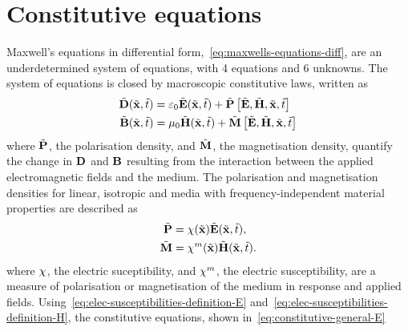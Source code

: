\section{Constitutive equations}
\label{Ch:PhysicalProblem:ConstitutiveEquations}
Maxwell's equations in differential form,~\eqref{eq:maxwells-equations-diff},
are an underdetermined system of equations, with 4 equations and 6 unknowns. The
system of equations is closed by macroscopic constitutive laws, written as
\begin{subequations}
  \begin{align}
    \tilde{\mathbf{D}}(\tilde{\mathbf{x}},\tilde{t}) &= \varepsilon_0 \tilde{\mathbf{E}}(\tilde{\mathbf{x}},\tilde{t}) + \tilde{\mathbf{P}}\left[ \tilde{\mathbf{E}}, \tilde{\mathbf{H}}, \tilde{\mathbf{x}}, \tilde{t} \right]  \label{eq:constitutive-general-E}\\
    \tilde{\mathbf{B}}(\tilde{\mathbf{x}},\tilde{t}) &= \mu_0 \tilde{\mathbf{H}}(\tilde{\mathbf{x}},\tilde{t}) + \tilde{\mathbf{M}}\left[ \tilde{\mathbf{E}}, \tilde{\mathbf{H}}, \tilde{\mathbf{x}}, \tilde{t} \right] \label{eq:constitutive-general-H}
  \end{align}
\end{subequations}
where $\tilde{\mathbf{P}}$, the polarisation density, and $\tilde{\mathbf{M}}$, the magnetisation
density, quantify the change in $\mathbf{D}$ and $\mathbf{B}$ resulting from the interaction
between the applied electromagnetic fields and the medium.
The polarisation and magnetisation densities for linear, isotropic and media
with frequency-independent material properties are described as
\begin{subequations}
  \begin{align}
    \tilde{\mathbf{P}} &= \chi(\tilde{\mathbf{x}}) \tilde{\mathbf{E}}(\tilde{\mathbf{x}},\tilde{t}), \label{eq:elec-susceptibilities-definition-E} \\
    \tilde{\mathbf{M}} &= \chi^{m}(\tilde{\mathbf{x}}) \tilde{\mathbf{H}}(\tilde{\mathbf{x}},\tilde{t}) . \label{eq:elec-susceptibilities-definition-H} 
  \end{align}
\end{subequations}
where $\chi$, the electric suceptibility, and $\chi^{m}$, the
electric susceptibility, are a measure of polarisation or magnetisation of the
medium in response and applied fields.
Using~\eqref{eq:elec-susceptibilities-definition-E}
and~\eqref{eq:elec-susceptibilities-definition-H}, the constitutive equations,
shown in~\eqref{eq:constitutive-general-E}

